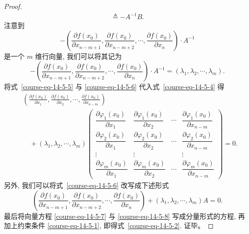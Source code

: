 \documentclass[12pt,fontset=fandol]{ctexart}
\begin{document}
\begin{proof}
\begin{equation}
\begin{aligned}
  \triangleq -A^{-1}B.
\end{aligned}
\label{course-eq-14-5-5}
\end{equation}
注意到
\[
  -
  \left(
    \frac{\partial f(x_0)}{\partial x_{n-m+1}},
    \frac{\partial f(x_0)}{\partial x_{n-m+2}},
    \cdots,
    \frac{\partial f(x_0)}{\partial x_n}
  \right)\cdot A^{-1}
\]
是一个 $m$ 维行向量, 我们可以将其记为
\begin{equation}
  -
  \left(
    \frac{\partial f(x_0)}{\partial x_{n-m+1}},
    \frac{\partial f(x_0)}{\partial x_{n-m+2}},
    \cdots,
    \frac{\partial f(x_0)}{\partial x_n}
  \right)\cdot A^{-1}
  =(\lambda_1,\lambda_2,\cdots,\lambda_m).
  \label{course-eq-14-5-6}
\end{equation}
将式~\eqref{course-eq-14-5-5}  与 \eqref{course-eq-14-5-6}  代入式~\eqref{course-eq-14-5-4}  得
\begin{equation}
\begin{aligned}
  &\left(
    \frac{\partial f(x_0)}{\partial x_1},
    \frac{\partial f(x_0)}{\partial x_2},
    \cdots,
    \frac{\partial f(x_0)}{\partial x_{n-m}}
  \right)\\
  &\quad+
  (\lambda_1,\lambda_2,\cdots,\lambda_m)
  \begin{pmatrix}
    \dfrac{\partial\varphi_1(x_0)}{\partial x_1} &
    \dfrac{\partial\varphi_1(x_0)}{\partial x_2} &
    \cdots &
    \dfrac{\partial\varphi_1(x_0)}{\partial x_{n-m}}\\
    \dfrac{\partial\varphi_2(x_0)}{\partial x_1} &
    \dfrac{\partial\varphi_2(x_0)}{\partial x_2} &
    \cdots &
    \dfrac{\partial\varphi_2(x_0)}{\partial x_{n-m}}\\
    \vdots & \vdots & & \vdots\\
    \dfrac{\partial\varphi_m(x_0)}{\partial x_1} &
    \dfrac{\partial\varphi_m(x_0)}{\partial x_2} &
    \cdots &
    \dfrac{\partial\varphi_m(x_0)}{\partial x_{n-m}}
  \end{pmatrix}
  =0.
\end{aligned}
\label{course-eq-14-5-7}
\end{equation}
另外, 我们可以将式~\eqref{course-eq-14-5-6}  改写成下述形式
\begin{equation}
  \left(
    \frac{\partial f(x_0)}{\partial x_{n-m+1}},
    \frac{\partial f(x_0)}{\partial x_{n-m+2}},
    \cdots,
    \frac{\partial f(x_0)}{\partial x_n}
  \right)
  +
  (\lambda_1,\lambda_2,\cdots,\lambda_m)
  A=0.
  \label{course-eq-14-5-8}
\end{equation}
最后将向量方程 \eqref{course-eq-14-5-7}  与 \eqref{course-eq-14-5-8}  写成分量形式的方程, 再加上约束条件 \eqref{course-eq-14-5-1}, 即得式~\eqref{course-eq-14-5-2}. 证毕。

\end{proof}
\end{document}

